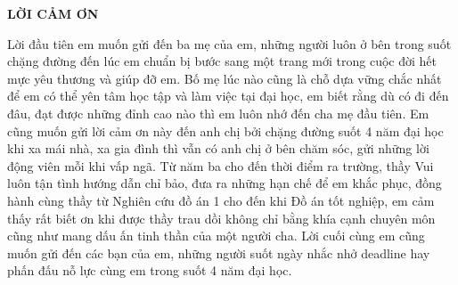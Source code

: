 \documentclass[../DoAn.tex]{subfiles}
\begin{document}
\begin{center}
    \Large{\textbf{LỜI CẢM ƠN}}\\
\end{center}
\vspace{1cm}
Lời đầu tiên em muốn gửi đến ba mẹ của em, những người luôn ở bên trong suốt chặng đường đến lúc em chuẩn bị bước sang một trang mới trong cuộc đời hết mực yêu thương và giúp đỡ em. Bố mẹ lúc nào cũng là chỗ dựa vững chắc nhất để em có thể yên tâm học tập và làm việc tại đại học, em biết rằng dù có đi đến đâu, đạt được những đỉnh cao nào thì em luôn nhớ đến cha mẹ đầu tiên. Em cũng muốn gửi lời cảm ơn này đến anh chị bởi chặng đường suốt 4 năm đại học khi xa mái nhà, xa gia đình thì vẫn có anh chị ở bên chăm sóc, gửi những lời động viên mỗi khi vấp ngã. Từ năm ba cho đến thời điểm ra trường, thầy Vui luôn tận tình hướng dẫn chỉ bảo, đưa ra những hạn chế để em khắc phục, đồng hành cùng thầy từ Nghiên cứu đồ án 1 cho đến khi Đồ án tốt nghiệp, em cảm thấy rất biết ơn khi được thầy trau dồi không chỉ bằng khía cạnh chuyên môn cũng như mang dấu ấn tinh thần của một người cha. Lời cuối cùng em cũng muốn gửi đến các bạn của em, những người suốt ngày nhắc nhở deadline hay phấn đấu nỗ lực cùng em trong suốt 4 năm đại học. 
\end{document}
